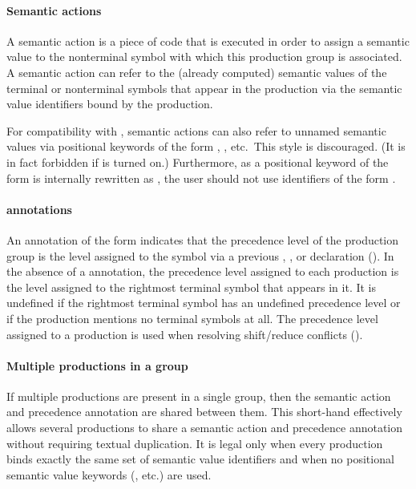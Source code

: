 \documentclass[onecolumn,11pt,nocopyrightspace,preprint]{sigplanconf}
\begin{document}
\paragraph{Semantic actions}
\label{sec:actions}

A semantic action is a piece of \ocaml code that is executed in order to
assign a semantic value to the nonterminal symbol with which this production
group is associated. A semantic action can refer to the (already computed)
semantic values of the terminal or nonterminal symbols that appear in the
production via the semantic value identifiers bound by the production.

For compatibility with \ocamlyacc, semantic actions can also refer to
unnamed semantic values via positional keywords of the form
, , etc.\ This style is discouraged.
(It is in fact forbidden if \onodollars is turned on.)
Furthermore, as
a positional keyword of the form  is internally rewritten as
, the user should not use identifiers of the form .

\paragraph{\dprec annotations}
\label{sec:prec}

An annotation of the form \dprec {} indicates that the precedence level
of the production group is the level assigned to the symbol  via a
previous \dnonassoc, \dleft, or \dright declaration (). In the
absence of a
\dprec annotation, the precedence level assigned to each production is the
level assigned to the rightmost terminal symbol that appears in it. It is
undefined if the rightmost terminal symbol has an undefined precedence level
or if the production mentions no terminal symbols at all. The precedence level
assigned to a production is used when resolving shift/reduce conflicts
().

\paragraph{Multiple productions in a group}

If multiple productions are present in a single group, then the semantic
action and precedence annotation are shared between them. This short-hand
effectively allows several productions to share a semantic action and
precedence annotation without requiring textual duplication. It is legal only
when every production binds exactly the same set of semantic value identifiers
and when no positional semantic value keywords (, etc.) are used.
\end{document}
